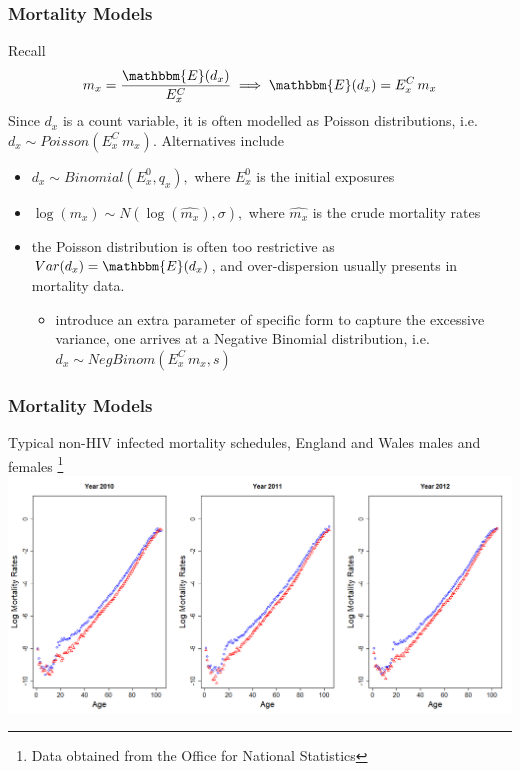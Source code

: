 \documentclass[hyperref={colorlinks, citecolor=blue}]{beamer}
\begin{document}
\begin{frame}
\frametitle{Mortality Models}
Recall 
\begin{align*}
m_x = \frac{\mathbbm{E}(d_x)}{E^C_x} \implies \mathbbm{E}(d_x) = E^C_x \, m_x
\end{align*}
Since $d_x$ is a count variable, it is often modelled as Poisson distributions, i.e. $d_x \sim Poisson(E^C_x \, m_x)$. Alternatives include
\begin{itemize}
\item $d_x \sim Binomial(E^0_x, q_x), $ where $E^0_x$ is the initial exposures
\item $\log(m_x) \sim N(\log(\hat{m_x}), \sigma), $ where $\hat{m_x}$ is the crude mortality rates

\item the Poisson distribution is often too restrictive as $Var(d_x) = \mathbbm{E}(d_x)$, and over-dispersion usually presents in mortality data.
\begin{itemize}
\item[\hookrightarrow] introduce an extra parameter of specific form to capture the excessive variance, one arrives at a Negative Binomial distribution, i.e. $d_x \sim NegBinom(E^C_x \, m_x, s)$
\end{itemize}
\end{itemize}
\end{frame}

\begin{frame}
\frametitle{Mortality Models}
Typical non-HIV infected mortality schedules, England and Wales males and females \footnote[frame]{Data obtained from the Office for National Statistics}
\newline
\includegraphics[width=\linewidth]{Graphs/crude mort rates.png}
\end{frame}
\end{document}
